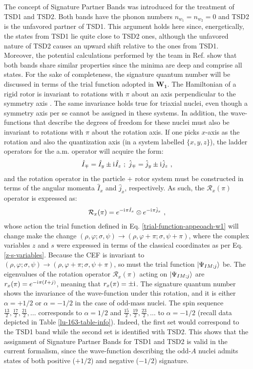 The concept of Signature Partner Bands was introduced for the treatment of TSD1 and TSD2. Both bands have the phonon numbers $n_{w_1}=n_{w_2}=0$ and TSD2 is the unfavored partner of TSD1. This argument holds here since, energetically, the states from TSD1 lie quite close to TSD2 ones, although the unfavored nature of TSD2 causes an upward shift relative to the ones from TSD1. Moreover, the potential calculations performed by the team in Ref. \cite{raduta2017semiclassical} show that both bands share similar properties since the minima are deep and comprise all states. For the sake of completeness, the signature quantum number will be discussed in terms of the trial function adopted in $\mathbf{W_1}$. The Hamiltonian of a rigid rotor is invariant to rotations with $\pi$ about an axis perpendicular to the symmetry axis \cite{bohr1998nuclear}. The same invariance holds true for triaxial nuclei, even though a symmetry axis per se cannot be assigned in these systems. In addition, the wave-functions that describe the degrees of freedom for these nuclei must also be invariant to rotations with $\pi$ about the rotation axis. If one picks $x$-axis as the rotation and also the quantization axis (in a system labelled $\{x,y,z\}$), the ladder operators for the a.m. operator will acquire the form:
\begin{align}
    \hat{I}_\mp=\hat{I}_y\pm\iu\hat{I}_z\ ;\ \hat{j}_\mp=\hat{j}_y\pm\iu\hat{j}_z\ ,
\end{align}
and the rotation operator in the particle + rotor system must be constructed in terms of the angular momenta $\hat{I}_x$ and $\hat{j}_x$, respectively. As such, the $\mathcal{R}_x(\pi)$ operator is expressed as:
\begin{align}
    \mathcal{R}_x(\pi)=e^{-\iu\pi\hat{I}_x}\otimes e^{-\iu\pi\hat{j}_x}\ ,
\end{align}
whose action the trial function defined in Eq. \ref{trial-function-appeoach-w1} will change make the change $(\rho,\varphi;\sigma,\psi)\to(\rho,\varphi+\pi;\sigma,\psi+\pi)$, where the complex variables $z$ and $s$ were expressed in terms of the classical coordinates as per Eq. \ref{z-s-variables}. Because the CEF is invariant to $(\rho,\varphi;\sigma,\psi)\to(\rho,\varphi+\pi;\sigma,\psi+\pi)$, so must the trial function $\ket{\Psi_{IM;j}}$ be. The eigenvalues of the rotation operator $\mathcal{R}_x(\pi)$ acting on $\ket{\Psi_{IM;j}}$ are $r_x(\pi)=e^{-\mathrm{i}\mkern1mu\pi(I+j)}$, meaning that $r_x(\pi)=\pm\mathrm{i}\mkern1mu$. The signature quantum number shows the invariance of the wave-function under this rotation, and it is either $\alpha=+1/2$ or $\alpha=-1/2$ in the case of odd-mass nuclei. The spin sequence $\frac{13}{2},\frac{17}{2},\frac{21}{2},\dots$ corresponds to $\alpha=1/2$ and $\frac{15}{2},\frac{19}{2},\frac{23}{2},\dots$ to $\alpha=-1/2$ (recall data depicted in Table \ref{lu-163-table-info}). Indeed, the first set would correspond to the TSD1 band while the second set is identified with TSD2. This shows that the assignment of Signature Partner Bands for TSD1 and TSD2 is valid in the current formalism, since the wave-function describing the odd-$A$ nuclei admits states of both positive ($+1/2$) and negative ($-1/2$) signature.

